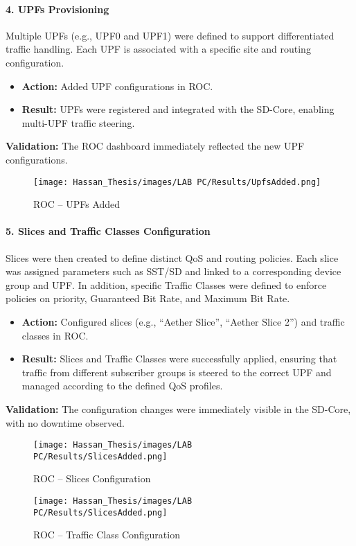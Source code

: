 \paragraph{4. UPFs Provisioning}  
Multiple UPFs (e.g., UPF0 and UPF1) were defined to support differentiated traffic handling. Each UPF is associated with a specific site and routing configuration.
\begin{itemize}
    \item \textbf{Action:} Added UPF configurations in ROC.
    \item \textbf{Result:} UPFs were registered and integrated with the SD-Core, enabling multi-UPF traffic steering.
\end{itemize}
\textbf{Validation:} The ROC dashboard immediately reflected the new UPF configurations.  
\begin{figure}[H]
  \centering
  \texttt{[image: Hassan\_Thesis/images/LAB PC/Results/UpfsAdded.png]}
  \caption{ROC – UPFs Added}
  \label{fig:UpfsAdded}
\end{figure}

\paragraph{5. Slices and Traffic Classes Configuration}  
Slices were then created to define distinct QoS and routing policies. Each slice was assigned parameters such as SST/SD and linked to a corresponding device group and UPF. In addition, specific Traffic Classes were defined to enforce policies on priority, Guaranteed Bit Rate, and Maximum Bit Rate.
\begin{itemize}
    \item \textbf{Action:} Configured slices (e.g., “Aether Slice”, “Aether Slice 2”) and traffic classes in ROC.
    \item \textbf{Result:} Slices and Traffic Classes were successfully applied, ensuring that traffic from different subscriber groups is steered to the correct UPF and managed according to the defined QoS profiles.
\end{itemize}
\textbf{Validation:} The configuration changes were immediately visible in the SD-Core, with no downtime observed.  
\begin{figure}[H]
  \centering
  \texttt{[image: Hassan\_Thesis/images/LAB PC/Results/SlicesAdded.png]}
  \caption{ROC – Slices Configuration}
  \label{fig:SlicesAdded}
\end{figure}
\begin{figure}[ht]
  \centering
  \texttt{[image: Hassan\_Thesis/images/LAB PC/Results/SlicesAdded.png]}
  \caption{ROC – Traffic Class Configuration}
  \label{fig:traffcieClassAdded}
\end{figure}


